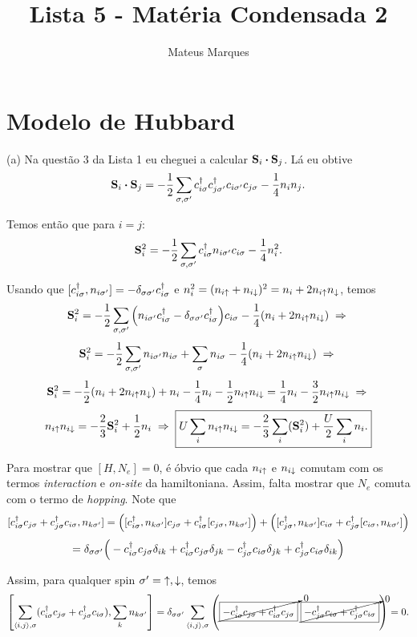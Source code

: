 \documentclass[a4paper,10pt]{article}
\title{\Huge{\textbf{Lista 5 - Matéria Condensada 2}}}
\author{Mateus Marques}
\begin{document}
\maketitle

\section{Modelo de Hubbard}

(a) Na questão 3 da Lista 1 eu cheguei a calcular $\S_i \vdot \S_j$. Lá eu obtive
$$
\S_i \vdot \S_j = -\frac{1}{2} \sum_{\s, \s'} c_{i\s}^\d c_{j\s'}^\d c_{i\s'} c_{j\s} - \frac{1}{4} n_i n_{j}.
$$

Temos então que para $i=j$:
$$
\vb{S}_i^2 = -\frac{1}{2} \sum_{\sigma,\sigma'} c_{i\sigma}^\dagger n_{i\sigma'} c_{i\sigma} - \frac{1}{4} n_i^2.
$$

Usando que $[c_{i\sigma}^\dagger, n_{i\sigma'}] = - \delta_{\sigma\sigma'} c_{i\sigma}^\dagger$ e $n_i^2 = (n_{i\uparrow} + n_{i\downarrow})^2 = n_i + 2 n_{i\uparrow} n_{\downarrow}$, temos
$$
\vb{S}_i^2 = -\frac{1}{2} \sum_{\sigma,\sigma'} \qty(n_{i\sigma'} c_{i\sigma}^\dagger - \delta_{\sigma\sigma'} c_{i\sigma}^\dagger ) c_{i\sigma} - \frac{1}{4} (n_i + 2 n_{i\uparrow} n_{i\downarrow}) \; \Rightarrow \;
$$
$$
\vb{S}_i^2 = -\frac{1}{2} \sum_{\sigma,\sigma'} n_{i\sigma'} n_{i\sigma} + \sum_{\sigma} n_{i\sigma} - \frac{1}{4} (n_i + 2 n_{i\uparrow} n_{i\downarrow}) \; \Rightarrow \;
$$
$$
\vb{S}_i^2 = -\frac{1}{2} (n_i + 2 n_{i\uparrow} n_{\downarrow}) + n_i - \frac{1}{4} n_i - \frac{1}{2} n_{i\uparrow} n_{i\downarrow} =
\frac{1}{4} n_i - \frac{3}{2} n_{i\uparrow} n_{i\downarrow} \; \Rightarrow \;
$$
$$
n_{i\uparrow} n_{i\downarrow} = -\frac{2}{3} \vb{S}_i^2 + \frac{1}{2} n_i \; \Rightarrow \;
\boxed{
U \sum_{i} n_{i\uparrow} n_{i\downarrow} =
-\frac{2}{3} \sum_{i} (\vb{S}_i^2) + \frac{U}{2} \sum_{i} n_i.
}
$$

Para mostrar que $[H, N_e] = 0$, é óbvio que cada $n_{i\uparrow}$ e $n_{i\downarrow}$ comutam com os termos \textit{interaction} e \textit{on-site} da hamiltoniana. Assim, falta mostrar que $N_e$ comuta com o termo de \textit{hopping}. Note que
$$
[c_{i\sigma}^\dagger c_{j\sigma} + c_{j\sigma}^\dagger c_{i\sigma}, n_{k\sigma'}] =
\Big([c_{i\sigma}^\dagger, n_{k\sigma'}] c_{j\sigma} + c_{i\sigma}^\dagger [c_{j\sigma}, n_{k\sigma'}]\Big) +
\Big([c_{j\sigma}^\dagger, n_{k\sigma'}] c_{i\sigma} + c_{j\sigma}^\dagger [c_{i\sigma}, n_{k\sigma'}]\Big)
$$
$$
=
\delta_{\sigma\sigma'} \Big(-c_{i\sigma}^\dagger c_{j\sigma} \delta_{ik} + c_{i\sigma}^\dagger c_{j\sigma} \delta_{jk} -
c_{j\sigma}^\dagger c_{i\sigma} \delta_{jk} + c_{j\sigma}^\dagger c_{i\sigma} \delta_{ik} \Big)
$$

Assim, para qualquer spin $\sigma' = \; \uparrow, \downarrow$, temos
$$
\qty[\sum_{\left\langle i , j \right\rangle, \sigma} (c_{i\sigma}^\dagger c_{j\sigma} + c_{j\sigma}^\dagger c_{i\sigma}),
\sum_{k} n_{k\sigma'} ] =
\delta_{\sigma\sigma'} \sum_{\left\langle i , j \right\rangle, \sigma}
\qty( \cancelto{0}{\boxed{-c_{i\sigma}^\dagger c_{j\sigma} + c_{i\sigma}^\dagger c_{j\sigma}}} \; \cancelto{0}{\boxed{- c_{j\sigma}^\dagger c_{i\sigma} + c_{j\sigma}^\dagger c_{i\sigma}}} ) = 0.
$$
\end{document}
